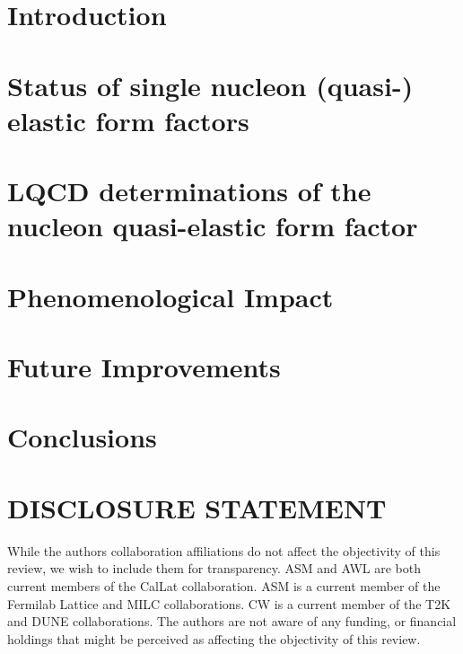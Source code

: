 \documentclass{ar-1col}
\begin{document}
\tableofcontents


\section{Introduction\label{sec:intro}}



\section{Status of single nucleon (quasi-) elastic form factors\label{sec:sof}}


\section{LQCD determinations of the nucleon quasi-elastic form factor\label{sec:lqcd}}



\section{Phenomenological Impact\label{sec:impact}}



\section{Future Improvements\label{sec:future}}



\section{Conclusions\label{sec:conclusions}}



\section*{DISCLOSURE STATEMENT}
While the authors collaboration affiliations do not affect the objectivity of this review, we wish to include them for transparency. ASM and AWL are both current members of the CalLat collaboration. ASM is a current member of the Fermilab Lattice and MILC collaborations. CW is a current member of the T2K and DUNE collaborations.
The authors are not aware of any funding, or financial holdings that might be perceived as affecting the objectivity of this review.
\end{document}
